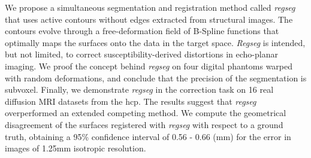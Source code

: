 We propose a simultaneous segmentation and registration method called \emph{regseg}
  that uses active contours without edges extracted from structural images.
The contours evolve through a free-deformation field of B-Spline functions that
  optimally maps the surfaces onto the data in the target space.
\emph{Regseg} is intended, but not limited, to correct susceptibility-derived distortions
  in echo-planar imaging.
We proof the concept behind \emph{regseg} on four digital phantoms warped with random
  deformations, and conclude that the precision of the segmentation is subvoxel.
Finally, we demonstrate \emph{regseg} in the correction task on 16 real diffusion MRI
  datasets from the \acrlong*{hcp}.
The results suggest that \emph{regseg} overperformed an extended competing method.
We compute the geometrical disagreement of the surfaces registered with \emph{regseg} with
  respect to a ground truth, obtaining a 95\% confidence interval of 0.56 - 0.66 (mm)
  for the error in images of 1.25mm isotropic resolution.

